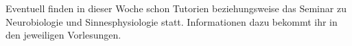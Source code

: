 

\footnotesize{Eventuell finden in dieser Woche schon Tutorien beziehungsweise das Seminar zu Neurobiologie und Sinnesphysiologie statt. Informationen dazu bekommt ihr in den jeweiligen Vorlesungen.}
\normalsize
\newpage
